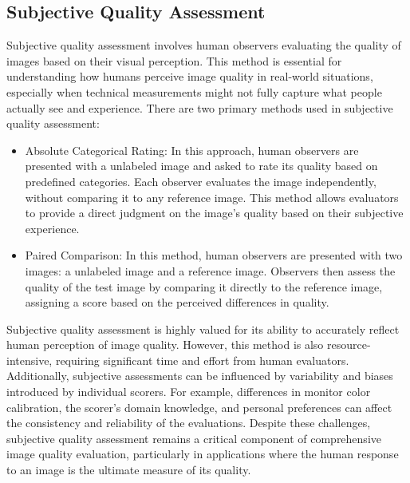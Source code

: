 \subsection{Subjective Quality Assessment}
\label{sub:SubjectiveQualityAssessment}
Subjective quality assessment involves human observers evaluating the quality of images based on their visual perception. This method is essential for understanding how humans perceive image quality in real-world situations, especially when technical measurements might not fully capture what people actually see and experience. There are two primary methods used in subjective quality assessment:\par
\begin{itemize}
    \item Absolute Categorical Rating:  In this approach, human observers are presented with a unlabeled image and asked to rate its quality based on predefined categories. Each observer evaluates the image independently, without comparing it to any reference image. This method allows evaluators to provide a direct judgment on the image’s quality based on their subjective experience.
    \item Paired Comparison:  In this method, human observers are presented with two images: a unlabeled image and a reference image. Observers then assess the quality of the test image by comparing it directly to the reference image, assigning a score based on the perceived differences in quality.
\end{itemize}
Subjective quality assessment is highly valued for its ability to accurately reflect human perception of image quality. However, this method is also resource-intensive, requiring significant time and effort from human evaluators. Additionally, subjective assessments can be influenced by variability and biases introduced by individual scorers. For example, differences in monitor color calibration, the scorer’s domain knowledge, and personal preferences can affect the consistency and reliability of the evaluations. Despite these challenges, subjective quality assessment remains a critical component of comprehensive image quality evaluation, particularly in applications where the human response to an image is the ultimate measure of its quality. \par

